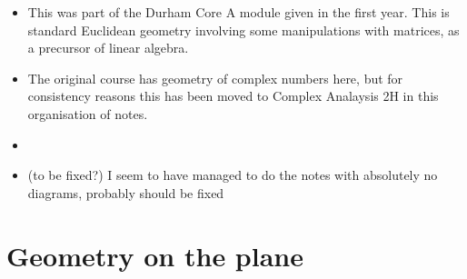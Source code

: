 \documentclass[10pt,notitlepage]{revtex4-1}
\newcommand\comment[1]{{\color{red}#1}}
\begin{document}
\begin{itemize}
  \item This was part of the Durham Core A module given in the first year. This
  is standard Euclidean geometry involving some manipulations with matrices, as
  a precursor of linear algebra.
  \item The original course has geometry of complex numbers here, but for
  consistency reasons this has been moved to Complex Analaysis 2H in this
  organisation of notes.
  \item[]
  \item \comment{(to be fixed?)} I seem to have managed to do the notes with
  absolutely no diagrams, probably should be fixed
\end{itemize}


\section{Geometry on the plane}
\end{document}

